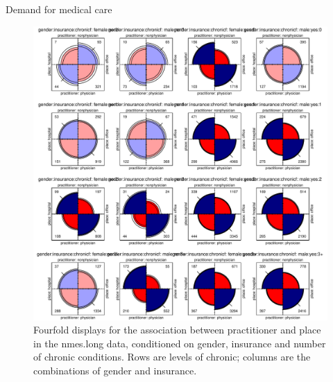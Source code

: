 \documentclass[11pt]{book}\usepackage[]{graphicx}\usepackage[]{color}
\newenvironment{knitrout}{}{} %
\renewenvironment{knitrout}{\small\renewcommand{\baselinestretch}{.85}}{} %
\begin{document}
\begin{Example}[nmes4]{Demand for medical care}
\begin{knitrout}
\begin{figure}[!htbp]
\centerline{\includegraphics[width=\textwidth]{ch09/fig/nmes4-fourfold2-1} }

\caption[Fourfold displays for the association between practitioner and place in the nmes]{Fourfold displays for the association between practitioner and place in the nmes.long data, conditioned on gender, insurance and number of chronic conditions. Rows are levels of chronic; columns are the combinations of gender and insurance.\label{fig:nmes4-fourfold2}}
\end{figure}



\end{knitrout}
\end{Example}
\end{document}
